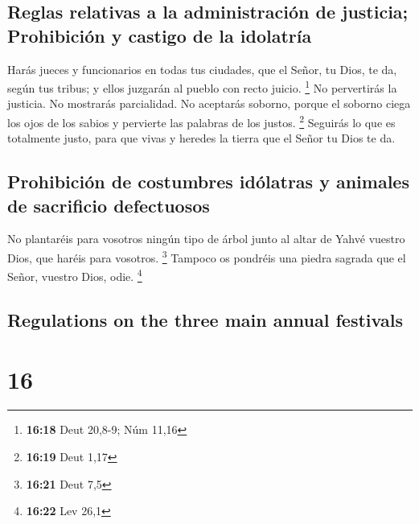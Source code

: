 \begin{paracol}{2}
\hypertarget{reglas-relativas-a-la-administraciuxf3n-de-justicia-prohibiciuxf3n-y-castigo-de-la-idolatruxeda}{%
\subsection{Reglas relativas a la administración de justicia;
Prohibición y castigo de la
idolatría}\label{reglas-relativas-a-la-administraciuxf3n-de-justicia-prohibiciuxf3n-y-castigo-de-la-idolatruxeda}}

 Harás jueces y funcionarios en todas tus ciudades, que
el Señor, tu Dios, te da, según tus tribus; y ellos juzgarán al pueblo
con recto juicio. \footnote{\textbf{16:18} Deut 20,8-9; Núm 11,16}
 No pervertirás la justicia. No mostrarás parcialidad. No
aceptarás soborno, porque el soborno ciega los ojos de los sabios y
pervierte las palabras de los justos. \footnote{\textbf{16:19} Deut 1,17}
 Seguirás lo que es totalmente justo, para que vivas y
heredes la tierra que el Señor tu Dios te da.

\hypertarget{prohibiciuxf3n-de-costumbres-iduxf3latras-y-animales-de-sacrificio-defectuosos}{%
\subsection{Prohibición de costumbres idólatras y animales de sacrificio
defectuosos}\label{prohibiciuxf3n-de-costumbres-iduxf3latras-y-animales-de-sacrificio-defectuosos}}

 No plantaréis para vosotros ningún tipo de árbol junto
al altar de Yahvé vuestro Dios, que haréis para vosotros. \footnote{\textbf{16:21}
  Deut 7,5}  Tampoco os pondréis una piedra sagrada que
el Señor, vuestro Dios, odie. \footnote{\textbf{16:22} Lev 26,1}

\switchcolumn
\begin{otherlanguage}{english}

\hypertarget{regulations-on-the-three-main-annual-festivals}{%
\subsection{Regulations on the three main annual
festivals}\label{regulations-on-the-three-main-annual-festivals}}

\hypertarget{section-31}{%
\section{16}\label{section-31}}


\end{otherlanguage}
\end{paracol}
